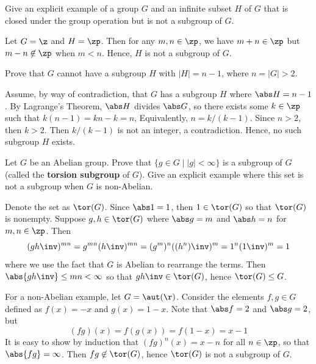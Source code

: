 \begin{exercise}\label{ex2.1.4}
    Give an explicit example of a group $G$ and an infinite subset $H$ of $G$ that is closed under the group operation but is not a subgroup of $G$.
\end{exercise}

\begin{sol}
    Let $G = \z$ and $H = \zp$. Then for any $m, n \in \zp$, we have $m + n \in \zp$ but $m - n \not\in \zp$ when $m < n$. Hence, $H$ is not a subgroup of $G$.
\end{sol}

\begin{exercise}\label{ex2.1.5}
    Prove that $G$ cannot have a subgroup $H$ with $|H| = n - 1$, where $n = |G| > 2$.
\end{exercise}

\begin{sol}
    Assume, by way of contradiction, that $G$ has a subgroup $H$ where $\abs H = n - 1$. By Lagrange's Theorem, $\abs H$ divides $\abs G$, so there exists some $k \in \zp$ such that $k(n - 1) = kn - k = n$, Equivalently, $n = k/(k - 1)$. Since $n > 2$, then $k > 2$. Then $k/(k - 1)$ is not an integer, a contradiction. Hence, no such subgroup $H$ exists.
\end{sol}

\begin{specialexercise} \label{ex2.1.6}
    Let $G$ be an Abelian group. Prove that $\{ g \in G \mid |g| < \infty \}$ is a subgroup of $G$ (called the \textbf{torsion subgroup} of $G$). Give an explicit example where this set is not a subgroup when $G$ is non-Abelian.
\end{specialexercise}

\begin{sol}
    Denote the set as $\tor(G)$. Since $\abs 1 = 1$, then $1 \in \tor(G)$ so that $\tor(G)$ is nonempty. Suppose $g, h \in \tor(G)$ where $\abs g = m$ and $\abs h = n$ for $m, n \in \zp$. Then
    \[(gh\inv)^{mn} = g^{mn}(h\inv)^{mn} = (g^m)^n((h^n)\inv)^m = 1^n(1\inv)^m = 1\]
    where we use the fact that $G$ is Abelian to rearrange the terms. Then $\abs{gh\inv} \leq mn < \infty$ so that $gh\inv \in \tor(G)$, hence $\tor(G) \leq G$.

    For a non-Abelian example, let $G = \aut(\r)$. Consider the elements $f, g \in G$ defined as $f(x) = -x$ and $g(x) = 1 - x$. Note that $\abs f = 2$ and $\abs g = 2$, but
    \[(fg)(x) = f(g(x)) = f(1 - x) = x - 1\]
    It is easy to show by induction that $(fg)^n(x) = x - n$ for all $n \in \zp$, so that $\abs{fg} = \infty$. Then $fg \not\in \tor(G)$, hence $\tor(G)$ is not a subgroup of $G$.
\end{sol}

